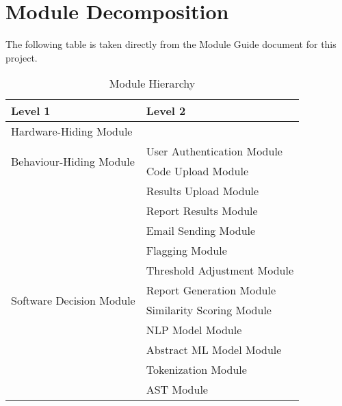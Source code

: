 \documentclass[12pt, titlepage]{article}
\begin{document}
\section{Module Decomposition}

The following table is taken directly from the Module Guide document for this project.

\begin{table}[h!]
    \centering
    \begin{tabular}{p{} p{}}
    \toprule
    \textbf{Level 1} & \textbf{Level 2} \\
    \midrule
    {Hardware-Hiding Module} & ~ \\
    \midrule
    \multirow{2}{*}{Behaviour-Hiding Module} 
    & User Authentication Module \\
    & Code Upload Module \\
    & Results Upload Module \\
    & Report Results Module \\
    & Email Sending Module \\
    & Flagging Module \\
    & Threshold Adjustment Module \\
    \midrule
    \multirow{2}{*}{Software Decision Module} 
    & Report Generation Module \\
    & Similarity Scoring Module \\
    & NLP Model Module \\
    & Abstract ML Model Module \\
    & Tokenization Module \\
    & AST Module \\
   
    \bottomrule
    \end{tabular}
    \caption{Module Hierarchy}
    \label{TblMH}
  \end{table}
\newpage
~\newpage




\end{document}
